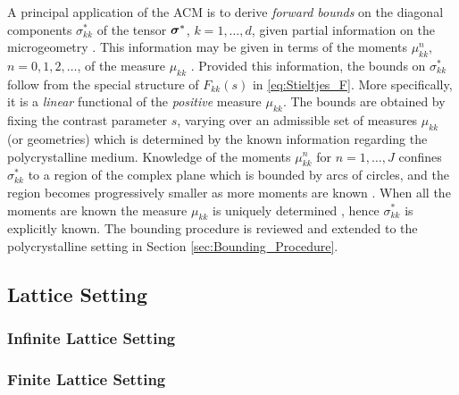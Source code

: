 \documentclass[11pt]{amsart}
\newcommand\bsig{\mbox{\boldmath${\sigma}$}}
\begin{document}
A principal application of the ACM is to derive \emph{forward bounds}
on the diagonal components $\sigma_{kk}^*$ of the tensor $\bsig^*$,
$k=1,\ldots,d$, given partial information on the microgeometry
\cite{Bergman:PRL-1285,Milton:APL-300,Golden:CMP-473,Bergman:AP-78}. This
information may be given in terms of the moments $\mu_{kk}^n$,
$n=0,1,2,\ldots$, of the measure $\mu_{kk}$
\cite{Milton:JAP-5294,Golden:CMP-473}. Provided this information, the 
bounds on $\sigma_{kk}^*$ follow from the special structure of $F_{kk}(s)$
in \eqref{eq:Stieltjes_F}. More specifically, it is a \emph{linear}
functional of the \emph{positive} measure $\mu_{kk}$.  The bounds are
obtained by fixing the contrast parameter $s$, varying over an
admissible set of measures $\mu_{kk}$ (or geometries) which is
determined by the known information regarding the polycrystalline
medium.  Knowledge of the moments $\mu_{kk}^n$  for $n=1,\ldots,J$ confines 
$\sigma_{kk}^*$ to a region of the complex plane which is bounded by arcs
of circles, and the region becomes progressively smaller as more
moments are known \cite{Milton:JAP-5294,Golden:1986:BCP}. When 
all the moments are known the measure $\mu_{kk}$ is uniquely determined 
\cite{Akhiezer:Book:1965}, hence  $\sigma_{kk}^*$ is explicitly known. The
bounding procedure
\cite{Bergman:PRL-1285,Milton:APL-300,Golden:CMP-473,Bergman:AP-78} is
reviewed and extended to the polycrystalline setting in Section
\ref{sec:Bounding_Procedure}. 







\subsection{Lattice Setting}
\label{sec:Lattice_Setting}


\subsubsection{Infinite Lattice Setting}
\label{sec:Infinite_Lattice_Setting}



\subsubsection{Finite Lattice Setting}
\label{sec:Finite_Lattice_Setting}
%
\end{document}
